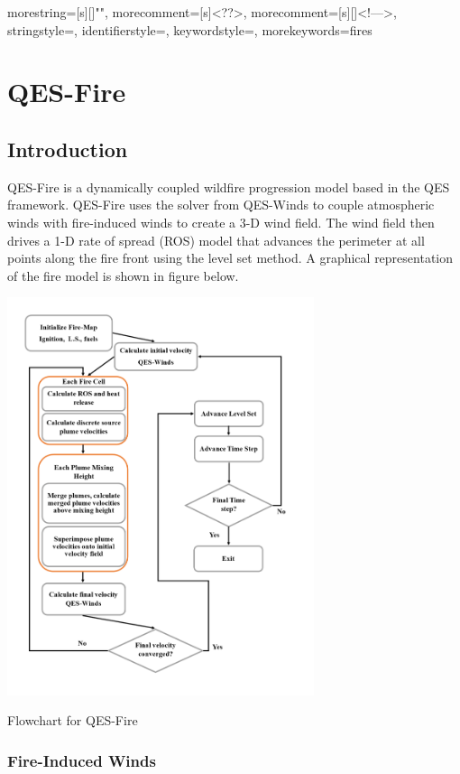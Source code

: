  {
  morestring=[s][\color{mauve}]{"}{"},
  morecomment=[s]{<?}{?>},
  morecomment=[s][\color{dkgreen}]{<!--}{-->},
  stringstyle=\color{black},
  identifierstyle=\color{lightblue},
  keywordstyle=\color{red},
  morekeywords={fires}%
}

\chapter{QES-Fire}

\section{Introduction}

QES-Fire \cite{Moody2022,Moody2023} is a dynamically coupled wildfire progression model based in the QES framework. QES-Fire uses the solver from QES-Winds to couple atmospheric winds with fire-induced winds to create a 3-D wind field. The wind field then drives a 1-D rate of spread (ROS) model that advances the perimeter at all points along the fire front using the level set method. A graphical representation of the fire model is shown in figure below.   

\includegraphics[width=9cm]{Images/Fire-Flowchart.png}
\caption{Flowchart for QES-Fire}

\subsection{Fire-Induced Winds}


